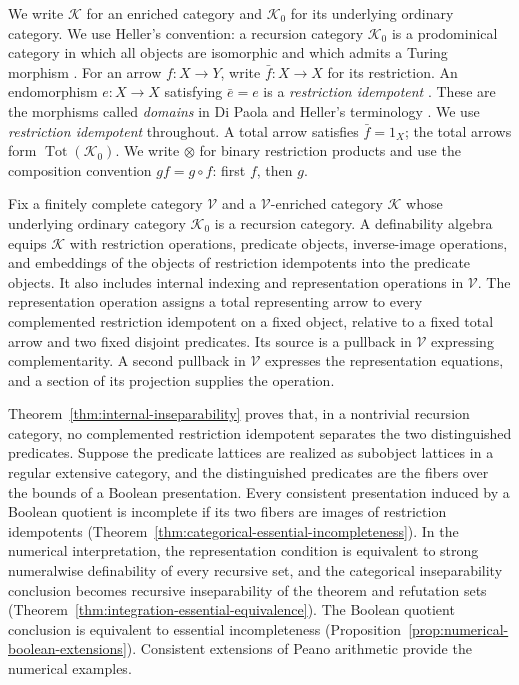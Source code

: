 \documentclass[11pt]{article}
\theoremstyle{definition}
\theoremstyle{remark}
\begin{document}
We write $\mathcal K$ for an enriched category and $\mathcal K_0$
for its underlying ordinary category. We use Heller's convention:
a recursion category $\mathcal K_0$ is a prodominical
category in which all objects are isomorphic and which admits a
Turing morphism \cite[Sections~5 and~9]{Heller}.
For an arrow $f:X\to Y$, write $\bar f:X\to X$ for its
restriction. An endomorphism $e:X\to X$ satisfying $\bar e=e$
is a \emph{restriction idempotent}
\cite[Section~2.1]{RestrictionI}.
These are the morphisms called \emph{domains} in Di Paola and
Heller's terminology \cite[Definition~3.1 and Lemma~3.2]{DPH}.
We use \emph{restriction idempotent} throughout.
A total arrow satisfies $\bar f=1_X$;
the total arrows form $\operatorname{Tot}(\mathcal K_0)$.
We write $\otimes$ for binary restriction products and use the
composition convention $gf=g\circ f$: first $f$, then $g$.

Fix a finitely complete category $\mathscr V$ and a
$\mathscr V$-enriched category $\mathcal K$ whose underlying
ordinary category $\mathcal K_0$ is a recursion category.
A definability algebra equips $\mathcal K$ with restriction
operations, predicate objects, inverse-image operations, and
embeddings of the objects of restriction idempotents into the
predicate objects. It also includes internal indexing and
representation operations in $\mathscr V$. The representation
operation assigns a total representing arrow to every complemented
restriction idempotent on a fixed object, relative to a fixed total
arrow and two fixed disjoint predicates. Its source is a pullback
in $\mathscr V$ expressing complementarity. A second pullback in
$\mathscr V$ expresses the representation equations, and a section
of its projection supplies the operation.

Theorem~\ref{thm:internal-inseparability} proves that, in a nontrivial
recursion category, no complemented restriction idempotent separates
the two distinguished predicates. Suppose the predicate lattices
are realized as subobject lattices in a regular extensive category,
and the distinguished predicates are the fibers over the bounds
of a Boolean presentation. Every consistent presentation induced
by a Boolean quotient is incomplete if its two fibers are images
of restriction idempotents
(Theorem~\ref{thm:categorical-essential-incompleteness}).
In the numerical interpretation, the representation condition is
equivalent to strong numeralwise definability of every recursive
set, and the categorical inseparability conclusion becomes
recursive inseparability of the theorem and refutation sets
(Theorem~\ref{thm:integration-essential-equivalence}).
The Boolean quotient conclusion is equivalent to essential
incompleteness (Proposition~\ref{prop:numerical-boolean-extensions}).
Consistent extensions of Peano arithmetic provide the numerical
examples.
\end{document}

